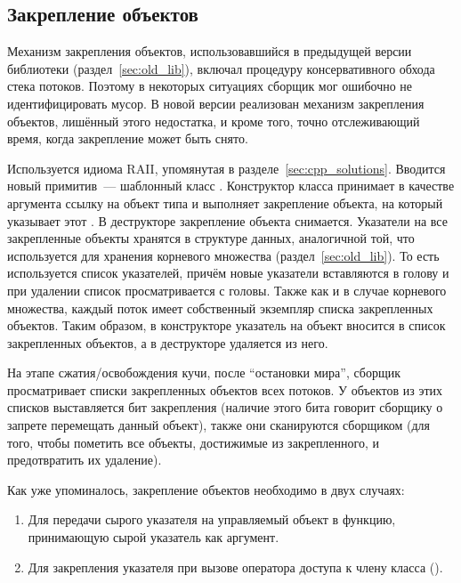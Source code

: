 \subsection{Закрепление объектов}
Механизм закрепления объектов, использовавшийся в предыдущей версии библиотеки 
(раздел~\ref{sec:old_lib}), включал процедуру консервативного обхода стека потоков. 
Поэтому в некоторых ситуациях сборщик мог ошибочно не идентифицировать мусор. 
В новой версии реализован механизм закрепления объектов, лишённый этого недостатка, и 
кроме того, точно отслеживающий время, когда закрепление может быть снято.

Используется идиома RAII, упомянутая в разделе~\ref{sec:cpp_solutions}. 
Вводится новый примитив~--- шаблонный класс . 
Конструктор класса  принимает в качестве аргумента ссылку на объект типа 
 и выполняет закрепление объекта, на который указывает этот . 
В деструкторе  закрепление объекта снимается. 
Указатели на все закрепленные объекты хранятся в структуре данных, аналогичной той, 
что используется для хранения корневого множества (раздел~\ref{sec:old_lib}). 
То есть используется список указателей, причём новые указатели вставляются в голову и 
при удалении список просматривается с головы. 
Также как и в случае корневого множества, каждый поток имеет собственный экземпляр списка 
закрепленных объектов. 
Таким образом, в конструкторе  указатель на объект вносится в список 
закрепленных объектов, а в деструкторе удаляется из него.

На этапе сжатия/освобождения кучи, после ``остановки мира'', сборщик просматривает списки 
закрепленных объектов всех потоков. 
У объектов из этих списков выставляется бит закрепления (наличие этого бита говорит сборщику 
о запрете перемещать данный объект), также они сканируются сборщиком (для того, чтобы 
пометить все объекты, достижимые из закрепленного, и предотвратить их удаление). 

Как уже упоминалось, закрепление объектов необходимо в двух случаях:
\begin{enumerate}
\item 
    Для передачи сырого указателя на управляемый объект в функцию, 
    принимающую сырой указатель как аргумент.
\item 
    Для закрепления указателя  при вызове оператора доступа к члену класса 
    ().
\end{enumerate}

